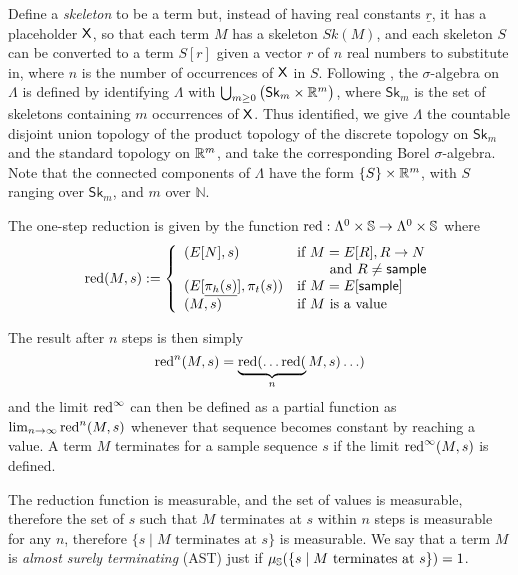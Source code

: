 Define a \emph{skeleton} to be a term but, instead of having real constants $\underline r$, it has a placeholder $\mathsf{X}$, so that each term $M$ has a skeleton $\mathit{Sk}(M)$, and each skeleton $S$ can be converted to a term $S[r]$ given a vector $r$ of $n$ real numbers to substitute in, where $n$ is the number of occurrences of $\mathsf{X}$ in $S$. 
Following \cite{DBLP:conf/icfp/BorgstromLGS16}, the $\sigma$-algebra on $\Lambda$ is defined by identifying $\Lambda$ with $\bigcup_{m\geq 0} \big(\mathsf{Sk}_m \times \mathbb{R}^m \big)$, where $\mathsf{Sk}_m$ is the set of skeletons containing $m$ occurrences of $\mathsf{X}$.
Thus identified, we give $\Lambda$ the countable disjoint union topology of the product topology of the discrete topology on $\mathsf{Sk}_m$ and the standard topology on $\mathbb{R}^m$, and take the corresponding Borel $\sigma$-algebra.
Note that the connected components of $\Lambda$ have the form $\{S\} \times \mathbb{R}^m$, with $S$ ranging over $\mathsf{Sk}_m$, and $m$ over $\mathbb{N}$.

The one-step reduction is given by the function $\operatorname{red} : \Lambda^0 \times {\mathbb{S}} \to \Lambda^0 \times {\mathbb{S}}$ where
\begin{equation*}
\operatorname{red}(M,s) := \left\{
    \begin{array}{ll}
        (E[N],s) & \text{if } M = E[R], R \to N\\
        & \qquad \text{ and } R \neq \mathsf{sample} \\
        (E[\underline{\pi_h(s)}],\pi_t(s)) & \text{if } M = E[\mathsf{sample}] \\
        (M,s) & \text{if } M \text{ is a value}
    \end{array} \right .
\end{equation*}

The result after $n$ steps is then simply 
\[
\operatorname{red}^n(M,s) = \underbrace{\operatorname{red}(\ldots\operatorname{red}(}_n M,s)\ldots)
\] 
and the limit $\operatorname{red}^\infty$ can then be defined as a partial function as $\lim_{n \to \infty} \operatorname{red}^n(M,s)$ whenever that sequence becomes constant by reaching a value. A term $M$ terminates for a sample sequence $s$ if the limit $\operatorname{red}^\infty(M,s)$ is defined.

The reduction function is measurable, and the set of values is measurable, therefore the set of $s$ such that $M$ terminates at $s$ within $n$ steps is measurable for any $n$, therefore $\{s \mid M \text{ terminates at } s \}$ is measurable. 
We say that a term $M$ is \emph{almost surely terminating} (AST) just if $\mu_{{\mathbb{S}}}(\{s \mid M \text{ terminates at } s\}) = 1$.

